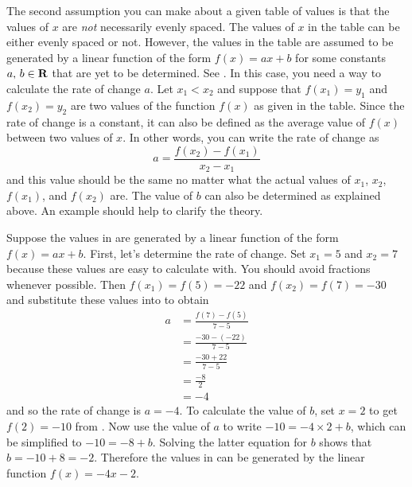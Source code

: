 \documentclass[a4paper,oneside,12pt]{article}
\begin{document}
The second assumption you can make about a given table of values is
that the values of $x$ are \emph{not} necessarily evenly spaced.  The
values of $x$ in the table can be either evenly spaced or not.
However, the values in the table are assumed to be generated by a
linear function of the form $f(x) = ax + b$ for some constants
${a},\, {b} \in \mathbf{R}$ that are yet to be determined.  See
.  In this case, you
need a way to calculate the rate of change $a$.  Let $x_1 < x_2$ and
suppose that $f(x_1) = y_1$ and $f(x_2) = y_2$ are two values of the
function $f(x)$ as given in the table.  Since the rate of change is a
constant, it can also be defined as the average value of $f(x)$
between two values of $x$.  In other words, you can write the rate of
change as
\begin{equation}
\label{eqn:linear_function_rate_of_change}
a
=
\frac{
  f(x_2) - f(x_1)
}{
  x_2 - x_1
}
\end{equation}
and this value should be the same no matter what the actual values of
$x_1$, $x_2$, $f(x_1)$, and $f(x_2)$ are.  The value of $b$ can also
be determined as explained above.  An example should help to clarify
the theory.

Suppose the values in 
are generated by a linear function of the form $f(x) = ax + b$.
First, let's determine the rate of change.  Set $x_1 = 5$ and
$x_2 = 7$ because these values are easy to calculate with.  You should
avoid fractions whenever possible.  Then $f(x_1) = f(5) = -22$ and
$f(x_2) = f(7) = -30$ and substitute these values into
 to obtain
\begin{align*}
a
&=
\frac{
  f(7) - f(5)
}{
  7 - 5
} \\[4pt]
&=
\frac{
  -30 - (-22)
}{
  7 - 5
} \\[4pt]
&=
\frac{
  -30 + 22
}{
  7 - 5
} \\[4pt]
&=
\frac{
  -8
}{
  2
} \\[4pt]
&=
-4
\end{align*}
and so the rate of change is $a = -4$.  To calculate the value of $b$,
set $x = 2$ to get $f(2) = -10$ from
.  Now use the value of
$a$ to write $-10 = -4 \times 2 + b$, which can be simplified to
$-10 = -8 + b$.  Solving the latter equation for $b$ shows that
$b = -10 + 8 = -2$.  Therefore the values in
 can be generated by
the linear function $f(x) = -4x - 2$.
\end{document}
